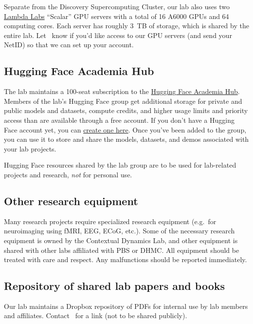 \documentclass{tufte-book} %
\begin{document}
 Separate from the Discovery Supercomputing Cluster, our lab also uses two
 \href{https://lambdalabs.com/}{Lambda Labs} ``Scalar'' GPU servers with a
 total of 16 A6000 GPUs and 64 computing cores. Each server has roughly 3~TB of
 storage, which is shared by the entire lab. Let \director~know if you'd like
 access to our GPU servers (and send your NetID) so that we can set up your
 account.

 \subsection{Hugging Face Academia Hub}
   The lab
 maintains a 100-seat subscription to the
 \href{https://huggingface.co/docs/hub/en/academia-hub}{Hugging Face
   Academia Hub}.  Members of the lab's Hugging Face group get
 additional storage for private and public models and datasets,
 compute credits, and higher usage limits and priority access than are
 available through a free account.  If you don't have a Hugging Face
 account yet, you can \href{https://huggingface.co/join}{create one
   here}.  Once you've been added to the group, you can use it to
 store and share the models, datasets, and demos associated with your
 lab projects.

 Hugging Face resources shared by the lab group are to be used for
 lab-related projects and research, \textit{not} for personal use.

 \subsection{Other research equipment}
 Many research projects require specialized research equipment (e.g.\
 for neuroimaging using fMRI, EEG, ECoG, etc.).  Some of the necessary
 research equipment is owned by the Contextual Dynamics Lab, and other
 equipment is shared with other labs affiliated with PBS or DHMC.  All
 equipment should be treated with care and respect.  Any malfunctions
 should be reported immediately.

\subsection{Repository of shared lab papers and books}
Our lab maintains a Dropbox repository of PDFs for internal use by lab
members and affiliates. Contact \director~for a link (not to be shared
publicly).
\end{document}
